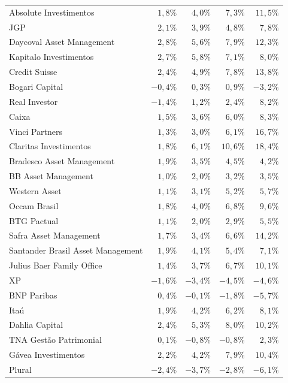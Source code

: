 \documentclass[11pt,a4paper]{article}
\begin{document}
\begin{center}
\begin{longtable}{@{}lrrrr@{}}
Absolute Investimentos & $1{,}8\%$ & $4{,}0\%$ & $7{,}3\%$ & $11{,}5\%$ \\
JGP & $2{,}1\%$ & $3{,}9\%$ & $4{,}8\%$ & $7{,}8\%$ \\
Daycoval Asset Management & $2{,}8\%$ & $5{,}6\%$ & $7{,}9\%$ & $12{,}3\%$ \\
Kapitalo Investimentos & $2{,}7\%$ & $5{,}8\%$ & $7{,}1\%$ & $8{,}0\%$ \\
Credit Suisse & $2{,}4\%$ & $4{,}9\%$ & $7{,}8\%$ & $13{,}8\%$ \\
Bogari Capital & $-0{,}4\%$ & $0{,}3\%$ & $0{,}9\%$ & $-3{,}2\%$ \\
Real Investor & $-1{,}4\%$ & $1{,}2\%$ & $2{,}4\%$ & $8{,}2\%$ \\
Caixa & $1{,}5\%$ & $3{,}6\%$ & $6{,}0\%$ & $8{,}3\%$ \\
Vinci Partners & $1{,}3\%$ & $3{,}0\%$ & $6{,}1\%$ & $16{,}7\%$ \\
Claritas Investimentos & $1{,}8\%$ & $6{,}1\%$ & $10{,}6\%$ & $18{,}4\%$ \\
Bradesco Asset Management & $1{,}9\%$ & $3{,}5\%$ & $4{,}5\%$ & $4{,}2\%$ \\
BB Asset Management & $1{,}0\%$ & $2{,}0\%$ & $3{,}2\%$ & $3{,}5\%$ \\
Western Asset & $1{,}1\%$ & $3{,}1\%$ & $5{,}2\%$ & $5{,}7\%$ \\
Occam Brasil & $1{,}8\%$ & $4{,}0\%$ & $6{,}8\%$ & $9{,}6\%$ \\
BTG Pactual & $1{,}1\%$ & $2{,}0\%$ & $2{,}9\%$ & $5{,}5\%$ \\
Safra Asset Management & $1{,}7\%$ & $3{,}4\%$ & $6{,}6\%$ & $14{,}2\%$ \\
Santander Brasil Asset Management & $1{,}9\%$ & $4{,}1\%$ & $5{,}4\%$ & $7{,}1\%$ \\
Julius Baer Family Office & $1{,}4\%$ & $3{,}7\%$ & $6{,}7\%$ & $10{,}1\%$ \\
XP & $-1{,}6\%$ & $-3{,}4\%$ & $-4{,}5\%$ & $-4{,}6\%$ \\
BNP Paribas & $0{,}4\%$ & $-0{,}1\%$ & $-1{,}8\%$ & $-5{,}7\%$ \\
Itaú & $1{,}9\%$ & $4{,}2\%$ & $6{,}2\%$ & $8{,}1\%$ \\
Dahlia Capital & $2{,}4\%$ & $5{,}3\%$ & $8{,}0\%$ & $10{,}2\%$ \\
TNA Gestão Patrimonial & $0{,}1\%$ & $-0{,}8\%$ & $-0{,}8\%$ & $2{,}3\%$ \\
Gávea Investimentos & $2{,}2\%$ & $4{,}2\%$ & $7{,}9\%$ & $10{,}4\%$ \\
Plural & $-2{,}4\%$ & $-3{,}7\%$ & $-2{,}8\%$ & $-6{,}1\%$ \\
\end{longtable}
\end{center}
\end{document}
